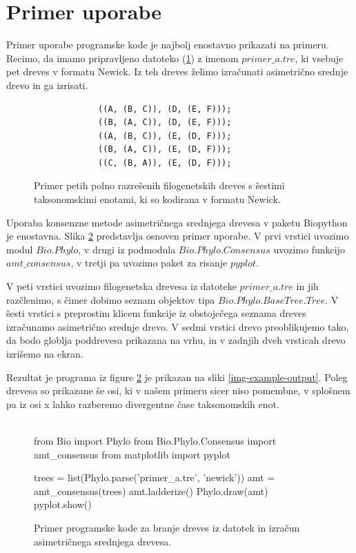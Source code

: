 \documentclass[a4paper, 12pt]{book}
\begin{document}
\section{Primer uporabe}
Primer uporabe programske kode je najbolj enostavno prikazati na primeru. Recimo, da imamo pripravljeno datoteko (\ref{trees-input}) z imenom $primer\_a.tre$, ki vsebuje pet dreves v formatu Newick. Iz teh dreves želimo izračunati asimetrično srednje drevo in ga izrisati.

\begin{figure}[h!]
\begin{lstlisting}
             ((A, (B, C)), (D, (E, F)));
             ((B, (A, C)), (D, (E, F)));
             ((A, (B, C)), (E, (D, F)));
             ((B, (A, C)), (E, (D, F)));
             ((C, (B, A)), (E, (D, F)));
\end{lstlisting}
\caption{Primer petih polno razrešenih filogenetskih dreves s šestimi taksonomskimi enotami, ki so kodirana v formatu Newick.}
\label{trees-input}
\end{figure}

Uporaba konsenzne metode asimetričnega srednjega drevesa v paketu Biopython je enostavna. Slika \ref{amt-example} predstavlja osnoven primer uporabe. V prvi vrstici uvozimo modul $Bio.Phylo$, v drugi iz podmodula $Bio.Phylo.Consensus$ uvozimo funkcijo $amt\_consensus$,  v tretji pa uvozimo paket za risanje $pyplot$.


V peti vrstici uvozimo filogenetska drevesa iz datoteke $primer\_a.tre$ in jih razčlenimo, s čimer dobimo seznam objektov tipa $Bio.Phylo.BaseTree.Tree$. V šesti vrstici s preprostim klicem funkcije iz obstoječega seznama dreves izračunamo asimetrično srednje drevo. V sedmi vrstici drevo preoblikujemo tako, da bodo globlja poddrevesa prikazana na vrhu, in v zadnjih dveh vrsticah drevo izrišemo na ekran. 

Rezultat je programa iz figure \ref{amt-example} je prikazan na sliki \ref{img-example-output}. Poleg drevesa so prikazane še osi, ki v našem primeru sicer niso pomembne, v splošnem pa iz osi x lahko razberemo divergentne čase taksonomskih enot. \\\\

\begin{figure}
	\begin{python}
		from Bio import Phylo
		from Bio.Phylo.Consensus import amt_consensus
		from matplotlib import pyplot
	
		trees = list(Phylo.parse('primer_a.tre', 'newick'))
		amt = amt_consensus(trees)
		amt.ladderize()
		Phylo.draw(amt)
		pyplot.show()
	\end{python}
	\caption{Primer programske kode za branje dreves iz datotek in izračun asimetričnega srednjega drevesa.}
	\label{amt-example}
\end{figure}
\end{document}
